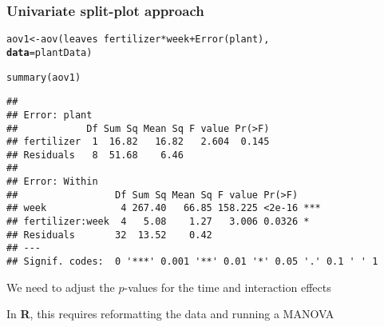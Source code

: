 \documentclass[color=usenames,dvipsnames]{beamer}\usepackage[]{graphicx}\usepackage[]{color}
\makeatletter
\newcommand{\hlopt}[1]{\textcolor[rgb]{0,0,0}{#1}}%
\newcommand{\hlstd}[1]{\textcolor[rgb]{0,0,0}{#1}}%
\newcommand{\hlkwb}[1]{\textcolor[rgb]{0,0.341,0.682}{#1}}%
\newcommand{\hlkwc}[1]{\textcolor[rgb]{0,0,0}{\textbf{#1}}}%
\newcommand{\hlkwd}[1]{\textcolor[rgb]{0.004,0.004,0.506}{#1}}%
\newenvironment{kframe}{%
 \def\at@end@of@kframe{}%
 \ifinner\ifhmode%
  \def\at@end@of@kframe{\end{minipage}}%
  \begin{minipage}{\columnwidth}%
 \fi\fi%
 \def\FrameCommand##1{\hskip\@totalleftmargin \hskip-\fboxsep
 \colorbox{shadecolor}{##1}\hskip-\fboxsep
     \hskip-\linewidth \hskip-\@totalleftmargin \hskip\columnwidth}%
 \MakeFramed {\advance\hsize-\width
   \@totalleftmargin\z@ \linewidth\hsize
   \@setminipage}}%
 {\par\unskip\endMakeFramed%
 \at@end@of@kframe}
\newenvironment{knitrout}{}{} %
\makeatother
\begin{document}



\begin{frame}[fragile]
  \frametitle{Univariate split-plot approach}
  \scriptsize
\begin{knitrout}\scriptsize
{}\color{fgcolor}\begin{kframe}
\begin{alltt}
\hlstd{aov1} \hlkwb{<-} \hlkwd{aov}\hlstd{(leaves} \hlopt{~} \hlstd{fertilizer}\hlopt{*}\hlstd{week} \hlopt{+} \hlkwd{Error}\hlstd{(plant),}
            \hlkwc{data}\hlstd{=plantData)}
\end{alltt}
\end{kframe}
\end{knitrout}
\pause
\begin{knitrout}\scriptsize
{}\color{fgcolor}\begin{kframe}
\begin{alltt}
\hlkwd{summary}\hlstd{(aov1)}
\end{alltt}
\begin{verbatim}
## 
## Error: plant
##            Df Sum Sq Mean Sq F value Pr(>F)
## fertilizer  1  16.82   16.82   2.604  0.145
## Residuals   8  51.68    6.46               
## 
## Error: Within
##                 Df Sum Sq Mean Sq F value Pr(>F)    
## week             4 267.40   66.85 158.225 <2e-16 ***
## fertilizer:week  4   5.08    1.27   3.006 0.0326 *  
## Residuals       32  13.52    0.42                   
## ---
## Signif. codes:  0 '***' 0.001 '**' 0.01 '*' 0.05 '.' 0.1 ' ' 1
\end{verbatim}
\end{kframe}
\end{knitrout}
\pause
\vfill
\footnotesize
{
  We need to adjust the $p$-values for the time and
  interaction effects \par
  \pause
  \vfill
  In {\bf R}, this requires reformatting the data and running a MANOVA \par}
\end{frame}
\end{document}
